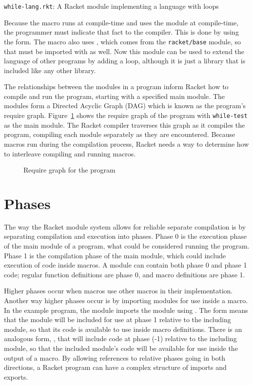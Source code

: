 \begin{listing}[tb]
  \inputminted{racket}{listings/while-lang.rkt}
  \caption{\texttt{while-lang.rkt}: A Racket module implementing a language with  loops}
  \label{lst:while-lang.rkt}
\end{listing}

Because the macro runs at compile-time and uses the  module at compile-time, the programmer must indicate that fact to the compiler.
This is done by using the  form. 
The macro also uses , which comes from the \texttt{racket/base} module, so that must be imported with  as well.
Now this module can be used to extend the language of other programs by adding a  loop, although it is just a library that is included like any other library.

The relationships between the modules in a program inform Racket how to compile and run the program, starting with a specified main module.
The modules form a Directed Acyclic Graph (DAG) which is known as the program's require graph.
Figure~\ref{fig:modules.tex} shows the require graph of the program with \texttt{while-test} as the main module. 
The Racket compiler traverses this graph as it compiles the program, compiling each module separately as they are encountered.
Because macros run during the compilation process, Racket needs a way to determine how to interleave compiling and running macros. 
\begin{figure}
  
  \caption{Require graph for the  program}
  \label{fig:modules.tex}
\end{figure}

\section{Phases}

The way the Racket module system allows for reliable separate compilation is by separating compilation and execution into phases.
Phase 0 is the execution phase of the main module of a program, what could be considered running the program.
Phase 1 is the compilation phase of the main module, which could include execution of code inside macros. 
A module can contain both phase 0 and phase 1 code; regular function definitions are phase 0, and macro definitions are phase 1.

Higher phases occur when macros use other macros in their implementation.
Another way higher phases occur is by importing modules for use inside a macro.
In the example program, the  module imports the  module using .
The  form means that the module will be included for use at phase 1 relative to the including module, so that its code is available to use inside macro definitions.
There is an analogous form, , that will include code at phase (-1) relative to the including module, so that the included module's code will be available for use inside the output of a macro. 
By allowing references to relative phases going in both directions, a Racket program can have a complex structure of imports and exports.

